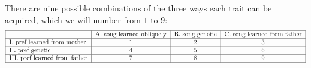 \documentclass{article}
\begin{document}
There are nine possible combinations of the three ways each trait can be acquired, which we will number from $1$ to $9$: 
\newline
\begin{equation*}
\begin{tabular}{|l|c|c|c|}
\hline & A. song learned obliquely  & B. song genetic & C. song learned from father
\\\hline I. pref learned from mother & 1 & 2 & 3
\\\hline II. pref genetic & 4 & 5 & 6
\\\hline III. pref learned from father & 7 & 8 & 9
\\\hline
\end{tabular}
\end{equation*}
\newline
\end{document}
